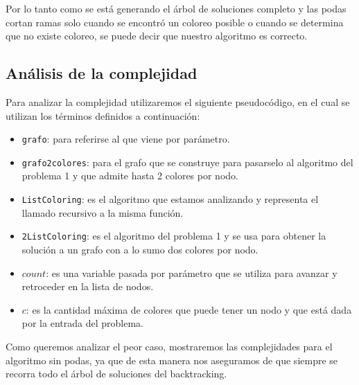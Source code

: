 Por lo tanto como se está generando el árbol de soluciones completo y las podas cortan ramas solo cuando se encontró un coloreo posible o cuando se determina que no existe coloreo, se puede decir que nuestro algoritmo es correcto.

\subsection{Análisis de la complejidad}
\label{sec:complj}

Para analizar la complejidad utilizaremos el siguiente pseudocódigo, en el cual se utilizan los términos definidos a continuación:
\begin{itemize}
	\item \texttt{grafo}: para referirse al que viene por parámetro.
	
	\item \texttt{grafo2colores}: para el grafo que se construye para pasarselo al algoritmo del problema 1 y que admite hasta 2 colores por nodo.
	
	\item \texttt{ListColoring}: es el algoritmo que estamos analizando y representa el llamado recursivo a la misma función. 
	
	\item \texttt{2ListColoring}: es el algoritmo del problema 1 y se usa para obtener la solución a un grafo con a lo sumo dos colores por nodo.
	
	\item $count$: es una variable pasada por parámetro que se utiliza para avanzar y retroceder en la lista de nodos.
	
	\item $c$: es la cantidad máxima de colores que puede tener un nodo y que está dada por la entrada del problema.
\end{itemize}

Como queremos analizar el peor caso, mostraremos las complejidades para el algoritmo sin podas, ya que de esta manera nos aseguramos de que siempre se recorra todo el árbol de soluciones del backtracking.
\newline


